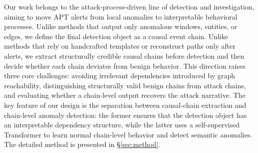 Our work belongs to the attack-process-driven line of detection and investigation, aiming to move APT alerts from local anomalies to interpretable behavioral processes. Unlike methods that output only anomalous windows, entities, or edges, we define the final detection object as a causal event chain. Unlike methods that rely on handcrafted templates or reconstruct paths only after alerts, we extract structurally credible causal chains before detection and then decide whether each chain deviates from benign behavior. This direction raises three core challenges: avoiding irrelevant dependencies introduced by graph reachability, distinguishing structurally valid benign chains from attack chains, and evaluating whether a chain-level output recovers the attack narrative. The key feature of our design is the separation between causal-chain extraction and chain-level anomaly detection: the former ensures that the detection object has an interpretable dependency structure, while the latter uses a self-supervised Transformer to learn normal chain-level behavior and detect semantic anomalies. The detailed method is presented in \S\ref{sec:method}.
